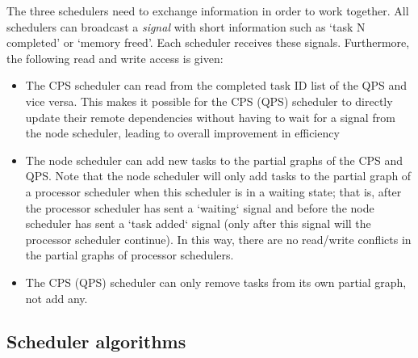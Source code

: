 The three schedulers need to exchange information in order to work together.
All schedulers can broadcast a \textit{signal} with short information such as `task N completed' or `memory freed'. Each scheduler receives these signals.
Furthermore, the following read and write access is given:
\begin{itemize}
    \item The CPS scheduler can read from the completed task ID list of the QPS and vice versa. This makes it possible for the CPS (QPS) scheduler to directly update their remote dependencies without having to wait for a signal from the node scheduler, leading to overall improvement in efficiency
    \item The node scheduler can add new tasks to the partial graphs of the CPS and QPS. Note that the node scheduler will only add tasks to the partial graph of a processor scheduler when this scheduler is in a waiting state; that is, after the processor scheduler has sent a `waiting` signal and before the node scheduler has sent a `task added` signal (only after this signal will the processor scheduler continue). In this way, there are no read/write conflicts in the partial graphs of processor schedulers.
    \item The CPS (QPS) scheduler can only remove tasks from its own partial graph, not add any.
\end{itemize}



\subsection{Scheduler algorithms}

